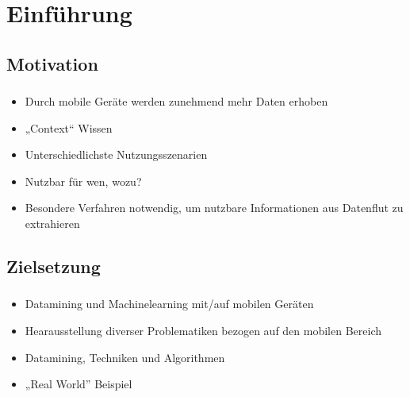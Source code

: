 \section{Einführung}


\subsection{Motivation}

\begin{frame}
    \frametitle{\insertsubsection} 
    \begin{itemize}
        \setlength\itemsep{1em}
        \item Durch mobile Geräte werden zunehmend mehr Daten erhoben
        \item „Context“ Wissen
        \item Unterschiedlichste Nutzungsszenarien
        \item Nutzbar für wen, wozu?
        \item Besondere Verfahren notwendig, um nutzbare Informationen aus Datenflut zu extrahieren
    \end{itemize}
\end{frame}


\subsection{Zielsetzung}

\begin{frame}
    \frametitle{\insertsubsection} 
    \begin{itemize}
        \setlength\itemsep{1em}
        \item Datamining und Machinelearning mit/auf mobilen Geräten
        \item Hearausstellung diverser Problematiken bezogen auf den mobilen Bereich
        \item Datamining, Techniken und Algorithmen
        \item „Real World” Beispiel
    \end{itemize}
\end{frame}
